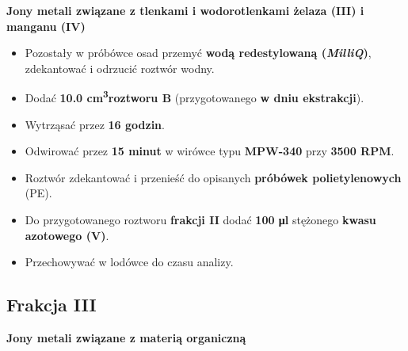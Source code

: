 \documentclass[
  letterpaper,
  DIV=11,
  numbers=noendperiod]{scrreprt}
\begin{document}
\textbf{Jony metali związane z tlenkami i wodorotlenkami żelaza (III) i
manganu (IV)}

\begin{itemize}
\item
  Pozostały w próbówce osad przemyć \textbf{wodą redestylowaną
  (\emph{MilliQ})}, zdekantować i odrzucić roztwór wodny.
\item
  Dodać \textbf{10.0 cm\textsuperscript{3}roztworu B} (przygotowanego
  \textbf{w dniu ekstrakcji}).
\item
  Wytrząsać przez \textbf{16 godzin}.
\item
  Odwirować przez \textbf{15 minut} w wirówce typu \textbf{MPW-340} przy
  \textbf{3500 RPM}.
\item
  Roztwór zdekantować i przenieść do opisanych \textbf{próbówek
  polietylenowych} (PE).
\item
  Do przygotowanego roztworu \textbf{frakcji II} dodać \textbf{100 μl}
  stężonego \textbf{kwasu azotowego (V)}.
\item
  Przechowywać w lodówce do czasu analizy.
\end{itemize}

\hypertarget{frakcja-iii}{%
\subsection{Frakcja III}\label{frakcja-iii}}

\textbf{Jony metali związane z materią organiczną}
\end{document}
